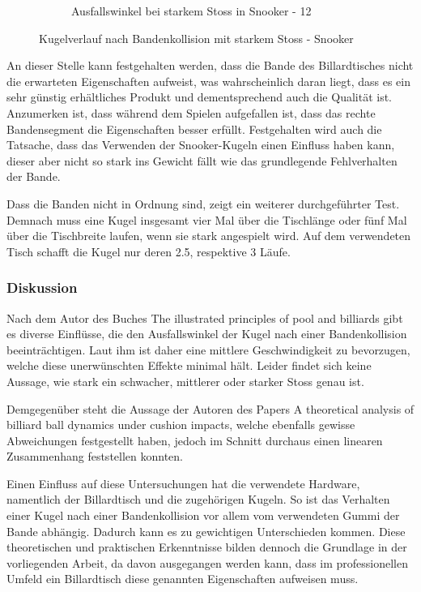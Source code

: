\begin{figure}[h!]
\begin{subfigure}[b]{0.2\textwidth}
        \caption{Ausfallswinkel bei starkem Stoss in Snooker - 12}
        \label{fig:rebound_angle_fast_snooker_12}
    \end{subfigure}
    \caption{Kugelverlauf nach Bandenkollision mit starkem Stoss - Snooker}
    \label{fig:kugelverlauf_nach_bandenkollision_mit_starkem_stoss_snooker}
\end{figure}

\newpage
An dieser Stelle kann festgehalten werden, dass die Bande des Billardtisches nicht die erwarteten Eigenschaften
aufweist, was wahrscheinlich daran liegt, dass es ein sehr günstig erhältliches Produkt und dementsprechend auch
die Qualität ist. Anzumerken ist, dass während dem Spielen aufgefallen ist, dass das rechte Bandensegment die
Eigenschaften besser erfüllt. Festgehalten wird auch die Tatsache, dass das Verwenden der Snooker-Kugeln einen
Einfluss haben kann, dieser aber nicht so stark ins Gewicht fällt wie das grundlegende Fehlverhalten
der Bande.

Dass die Banden nicht in Ordnung sind, zeigt ein weiterer durchgeführter Test. Demnach muss eine Kugel insgesamt vier Mal über
die Tischlänge oder fünf Mal über die Tischbreite laufen, wenn sie stark angespielt wird\cite{sport64:bandengummi}.
Auf dem verwendeten Tisch schafft die Kugel nur deren 2.5, respektive 3 Läufe.

\newpage
\subsubsection{Diskussion}
Nach dem Autor des Buches \glqq The illustrated principles of pool and billiards\grqq{} gibt es diverse Einflüsse,
die den Ausfallswinkel der Kugel nach einer Bandenkollision beeinträchtigen. Laut ihm ist daher eine mittlere
Geschwindigkeit zu bevorzugen, welche diese unerwünschten Effekte minimal hält\cite{book:the_ilustrated_principles_of_pool_and_billiards}.
Leider findet sich keine Aussage, wie stark ein schwacher, mittlerer oder starker Stoss genau ist.

Demgegenüber steht die Aussage der Autoren des Papers \glqq A theoretical analysis of billiard ball dynamics under cushion impacts\grqq, welche ebenfalls
gewisse Abweichungen festgestellt haben, jedoch im Schnitt durchaus einen linearen Zusammenhang feststellen konnten.

Einen Einfluss auf diese Untersuchungen hat die verwendete Hardware, namentlich der Billardtisch und die
zugehörigen Kugeln. So ist das Verhalten einer Kugel nach einer Bandenkollision vor allem vom verwendeten Gummi der
Bande abhängig. Dadurch kann es zu gewichtigen Unterschieden kommen.
Diese theoretischen und praktischen Erkenntnisse bilden dennoch die Grundlage in der vorliegenden Arbeit,
da davon ausgegangen werden kann, dass im professionellen  Umfeld ein Billardtisch diese genannten Eigenschaften aufweisen muss.

